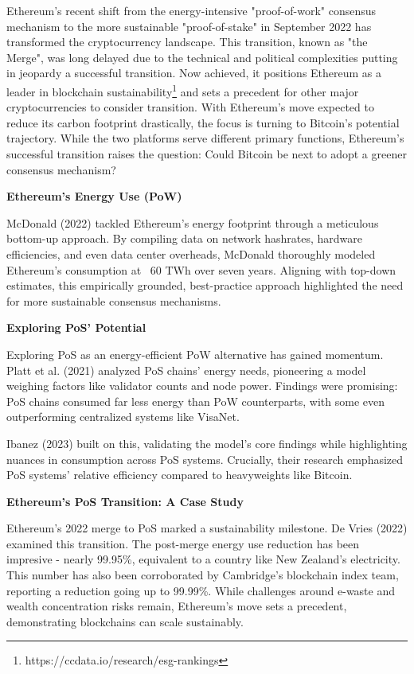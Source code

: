 \documentclass[11pt]{report}
\begin{document}
Ethereum's recent shift from the energy-intensive "proof-of-work" consensus mechanism to the more sustainable "proof-of-stake" in September 2022 has transformed the cryptocurrency landscape. This transition, known as "the Merge", was long delayed due to the technical and political complexities putting in jeopardy a successful transition\cite{bloombergnewsEthereumMergeYour2022}. Now achieved, it positions Ethereum as a leader in blockchain sustainability\footnote{https://ccdata.io/research/esg-rankings} and sets a precedent for other major cryptocurrencies to consider transition. With Ethereum's move expected to reduce its carbon footprint drastically, the focus is turning to Bitcoin's potential trajectory. While the two platforms serve different primary functions, Ethereum's successful transition raises the question: Could Bitcoin be next to adopt a greener consensus mechanism?


\textbf{Ethereum's Energy Use (PoW)}

McDonald (2022)\cite{mcdonaldEthereumEmissionsBottomup2022} tackled Ethereum's energy footprint through a meticulous bottom-up approach. By compiling data on network hashrates, hardware efficiencies, and even data center overheads, McDonald thoroughly modeled Ethereum's consumption at ~60 TWh over seven years. Aligning with top-down estimates, this empirically grounded, best-practice approach highlighted the need for more sustainable consensus mechanisms.

\textbf{Exploring PoS' Potential}

Exploring PoS as an energy-efficient PoW alternative has gained momentum. Platt et al. (2021)\cite{plattEnergyFootprintBlockchain2021} analyzed PoS chains' energy needs, pioneering a model weighing factors like validator counts and node power. Findings were promising: PoS chains consumed far less energy than PoW counterparts, with some even outperforming centralized systems like VisaNet.

Ibanez (2023) built on this, validating the model's core findings while highlighting nuances in consumption across PoS systems. Crucially, their research emphasized PoS systems' relative efficiency compared to heavyweights like Bitcoin.

\textbf{Ethereum's PoS Transition: A Case Study}

Ethereum's 2022 merge to PoS marked a sustainability milestone. De Vries (2022)\cite{devriesCryptocurrenciesRoadSustainability2022} examined this transition. The post-merge energy use reduction has been impresive - nearly 99.95\%, equivalent to a country like New Zealand's electricity. This number has also been corroborated by Cambridge's blockchain index team, reporting a reduction going up to 99.99\%\cite{CambridgeEthereumElectricity}. While challenges around e-waste and wealth concentration risks remain, Ethereum's move sets a precedent, demonstrating blockchains can scale sustainably.
\end{document}
